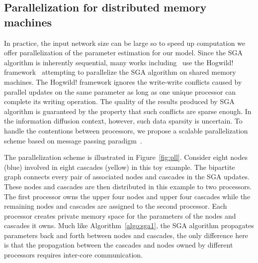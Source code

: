\subsection{Parallelization for distributed memory machines}
In practice, the input network size can be large so to speed up computation we offer parallelization of the parameter estimation for our model. Since the SGA algorithm is inherently sequential, many works including~\cite{ji2016parallelizing,mikolov2013distributed} use the Hogwild! framework~\cite{recht2011hogwild} attempting to parallelize the SGA algorithm on shared memory machines. The Hogwild! framework ignores the write-write conflicts caused by parallel updates on the same parameter as long as one unique processor can complete its writing operation. The quality of the results produced by SGA algorithm is guaranteed by the property that such conflicts are sparse enough. In the information diffusion context, however, such data sparsity is uncertain. To handle the contentions between processors, we propose a scalable parallelization scheme based on message passing paradigm~\cite{gropp1999using}.

The parallelization scheme is illustrated in Figure~\ref{fig:pll}. Consider eight nodes (blue) involved in eight cascades (yellow) in this toy example. The bipartite graph connects every pair of associated nodes and cascades in the SGA updates. These nodes and cascades are then distributed in this example to two processors. The first processor owns the upper four nodes and upper four cascades while the remaining nodes and cascades are assigned to the second processor. Each processor creates private memory space for the parameters of the nodes and cascades it owns. Much like Algorithm~\ref{algo:sga1}, the SGA algorithm propagates parameters back and forth between nodes and cascades, the only difference here is that the propagation between the cascades and nodes owned by different processors requires inter-core communication.


